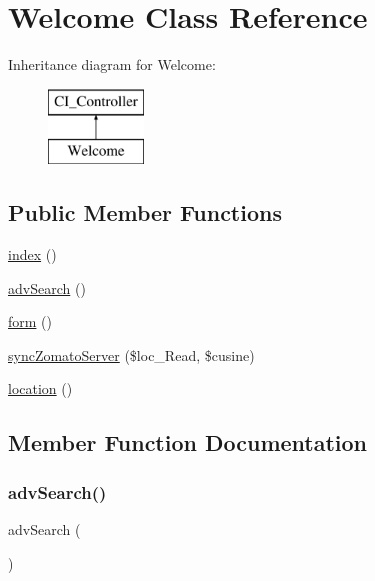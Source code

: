 \hypertarget{class_welcome}{}\section{Welcome Class Reference}
\label{class_welcome}
Inheritance diagram for Welcome\+:\begin{figure}[H]
\begin{center}
\leavevmode
\includegraphics[height=2.000000cm]{class_welcome}
\end{center}
\end{figure}
\subsection*{Public Member Functions}
\begin{DoxyCompactItemize}
\item 
\mbox{\hyperlink{class_welcome_a149eb92716c1084a935e04a8d95f7347}{index}} ()
\item 
\mbox{\hyperlink{class_welcome_a76ab733fc756846ce6b6cdaddb8c005a}{adv\+Search}} ()
\item 
\mbox{\hyperlink{class_welcome_a4d5123cf815fd723d6dfdcb2c16fcc42}{form}} ()
\item 
\mbox{\hyperlink{class_welcome_a7edf443ddd63ae9348516d11b66d90a8}{sync\+Zomato\+Server}} (\$loc\+\_\+\+Read, \$cusine)
\item 
\mbox{\hyperlink{class_welcome_a1149321de0575cabb0e83f18de85728f}{location}} ()
\end{DoxyCompactItemize}


\subsection{Member Function Documentation}
\mbox{\label{class_welcome_a76ab733fc756846ce6b6cdaddb8c005a}} 
\subsubsection{\texorpdfstring{adv\+Search()}{advSearch()}}
{\footnotesize\ttfamily adv\+Search (\begin{DoxyParamCaption}{ }\end{DoxyParamCaption})}

